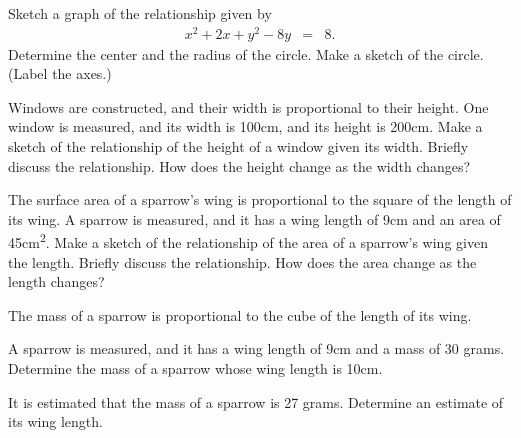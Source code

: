 \begin{problem}
\item Sketch a graph of the relationship given by
  \begin{eqnarray*}
    x^2 + 2x + y^2 - 8y & = & 8.
  \end{eqnarray*}
  Determine the center and the radius of the circle.
  Make a sketch of the circle. (Label the axes.)
  \vfill

  \clearpage

\item Windows are constructed, and their width is proportional to
  their height. One window is measured, and its width is 100cm, and its
  height is 200cm. Make a sketch of the relationship of the height of
  a window given its width. Briefly discuss the relationship. How does
  the height change as the width changes?

  \vfill

\item The surface area of a sparrow's wing is proportional to the
  square of the length of its wing. A sparrow is measured, and it has
  a wing length of 9cm and an area of 45cm\textsuperscript{2}. Make a
  sketch of the relationship of the area of a sparrow's wing given the
  length. Briefly discuss the relationship. How does the area change
  as the length changes?

  \vfill

\clearpage

\item The mass of a sparrow is proportional to the cube of the length of its wing.
  \begin{subproblem}
    \item \label{sparrowMass} A sparrow is measured, and it has a wing length of 9cm and a mass of 30 grams.
    Determine the mass of a sparrow whose wing length is 10cm.
    \vfill

    \item It is estimated that the mass of a sparrow is 27 grams. Determine an estimate
    of its wing length.
    \vfill
  \end{subproblem}

\end{problem}

\postClass

